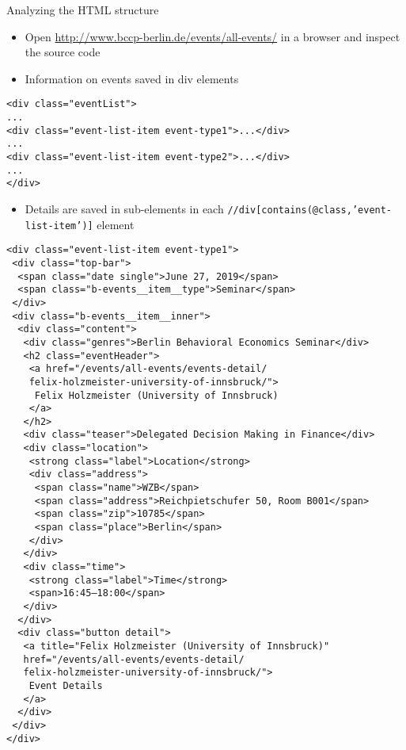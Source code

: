 \begin{frame}{Analyzing the HTML structure}
\begin{itemize}
	\item Open \url{http://www.bccp-berlin.de/events/all-events/} in a browser and inspect the source code
	\item Information on events saved in div elements
\end{itemize}
\begin{verbatim}
<div class="eventList">
...
<div class="event-list-item event-type1">...</div>
...
<div class="event-list-item event-type2">...</div>
...
</div>
\end{verbatim}

\framebreak

\begin{itemize}
	\item Details are saved in sub-elements in each \texttt{//div[contains(@class,'event-list-item')]} element
\end{itemize}
\begin{verbatim}
<div class="event-list-item event-type1">
 <div class="top-bar">
  <span class="date single">June 27, 2019</span>
  <span class="b-events__item__type">Seminar</span>
 </div>
 <div class="b-events__item__inner">
  <div class="content">
   <div class="genres">Berlin Behavioral Economics Seminar</div>
   <h2 class="eventHeader">
    <a href="/events/all-events/events-detail/
    felix-holzmeister-university-of-innsbruck/">
     Felix Holzmeister (University of Innsbruck)
    </a>
   </h2>
   <div class="teaser">Delegated Decision Making in Finance</div>
   <div class="location">
    <strong class="label">Location</strong>
    <div class="address">
     <span class="name">WZB</span>
     <span class="address">Reichpietschufer 50, Room B001</span>
     <span class="zip">10785</span>
     <span class="place">Berlin</span>
    </div>
   </div>
   <div class="time">
    <strong class="label">Time</strong>
    <span>16:45–18:00</span>
   </div>
  </div>
  <div class="button detail">
   <a title="Felix Holzmeister (University of Innsbruck)"
   href="/events/all-events/events-detail/
   felix-holzmeister-university-of-innsbruck/">
    Event Details
   </a>
  </div>
 </div>
</div>
\end{verbatim}
\end{frame}

